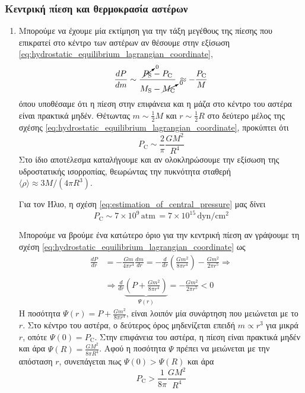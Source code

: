 \subsubsection{Κεντρική πίεση και θερμοκρασία αστέρων}
\begin{enumerate}
    \item Μπορούμε να έχουμε μία εκτίμηση για την τάξη μεγέθους της πίεσης που επικρατεί στο κέντρο των αστέρων αν θέσουμε στην εξίσωση \eqref{eq:hydrostatic_equilibrium_lagrangian_coordinate},
        \begin{equation}
            \frac{dP}{dm} \sim \frac{\cancelto{0}{P_{\text{S}}} - P_{\text{C}}}{M_{\text{S}} - \cancelto{0}{M_{\text{C}}}} \,\approx - \frac{P_{\text{C}}}{M}
        \end{equation}
        όπου υποθέσαμε ότι η πίεση στην επιφάνεια και η μάζα στο κέντρο του αστέρα είναι πρακτικά μηδέν. Θέτωντας $m \sim \frac{1}{2} M $ και $r \sim \frac{1}{2} R$ στο δεύτερο μέλος της σχέσης \eqref{eq:hydrostatic_equilibrium_lagrangian_coordinate}, προκύπτει ότι 
        \begin{equation}
            \label{eq:estimation_of_central_pressure}
            \boxed{P_{\text{C}} \sim \frac{2}{\pi} \frac{G M^2}{R^4}}
        \end{equation}
        Στο ίδιο αποτέλεσμα καταλήγουμε και αν ολοκληρώσουμε την εξίσωση της υδροστατικής ισορροπίας, θεωρώντας την πυκνότητα σταθερή $\langle \rho \rangle \approx 3M/(4\pi R^3)$.
        
        Για τον Ήλιο, η σχέση \eqref{eq:estimation_of_central_pressure} μας δίνει $$P_{\text{C}} \sim 7 \times 10^9 \,\text{atm} \,= 7 \times 10^{15} \,\text{dyn/cm$^2$}$$
        
        Μπορούμε να βρούμε ένα κατώτερο όριο για την κεντρική πίεση αν γράψουμε τη σχέση \eqref{eq:hydrostatic_equilibrium_lagrangian_coordinate} ως
        \begin{align*}
            \frac{dP}{dr} &= - \frac{Gm}{4\pi r^4} \frac{dm}{dr} = - \frac{d}{dr} \left( \frac{Gm^2}{8\pi r^4} \right) - \frac{Gm^2}{2\pi r^5} \Rightarrow \\\\
            &\Rightarrow \frac{d}{dr} \underbrace{\left( P + \frac{G m^2}{8 \pi r^4} \right)}_{\Psi(r)} = - \frac{G m^2}{2\pi r^5} < 0
        \end{align*}
        Η ποσότητα $\displaystyle \Psi(r) = P + \frac{G m^2}{8 \pi r^4}$, είναι λοιπόν μία συνάρτηση που μειώνεται με το $r$. Στο κέντρο του αστέρα, ο δεύτερος όρος μηδενίζεται επειδή $m \propto r^3$ για μικρά $r$, οπότε $\Psi(0) = P_{\text{C}}$. Στην επιφάνεια του αστέρα, η πίεση είναι πρακτικά μηδέν και άρα $\displaystyle \Psi(R) = \frac{GM^2}{8\pi R^4}$. Αφού η ποσότητα $\Psi$ πρέπει να μειώνεται με την απόσταση $r$, συνεπάγεται πως $\Psi(0) > \Psi(R)$ και άρα
        \begin{equation}
            \label{eq:lower_limit_of_central_pressure_for_stars_in_HE}
            P_{\text{C}} > \frac{1}{8\pi} \frac{GM^2}{R^4}
        \end{equation}
        

\end{enumerate}
